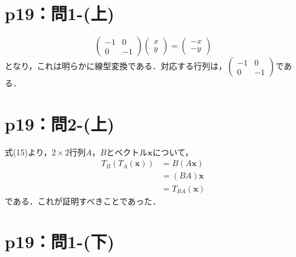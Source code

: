 \section*{p19：問1-(上)}
%
%
\begin{tproof}
  \[
    \begin{pmatrix}
      -1 & 0  \\
      0  & -1
    \end{pmatrix}
    \begin{pmatrix}
      x \\
      y
    \end{pmatrix}
    =
    \begin{pmatrix}
      -x \\
      -y
    \end{pmatrix}
  \]
  となり，これは明らかに線型変換である．対応する行列は，$
    \begin{pmatrix}
      -1 & 0  \\
      0  & -1
    \end{pmatrix}
  $である．
\end{tproof}

\section*{p19：問2-(上)}
\begin{tproof}
  式(15)より，$2 \times 2$行列$A$，$B$とベクトル$\bm{x}$について，
  \begin{align*}
    T_B (T_A (\bm{x})) & = B(A\bm{x})      \\
                       & = (BA) \bm{x}     \\
                       & = T_{BA} (\bm{x})
  \end{align*}
  である．これが証明すべきことであった．
\end{tproof}


\section*{p19：問1-(下)}

